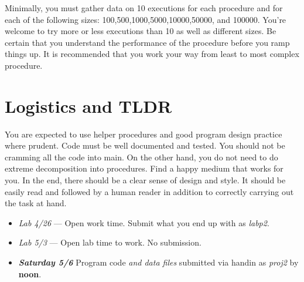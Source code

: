 \documentclass[]{tufte-handout}
\begin{document}
Minimally, you must gather data on 10 executions for each procedure and for each of the following sizes: 100,500,1000,5000,10000,50000, and 100000. You're welcome to try more or less executions than 10 as well as different sizes. Be certain that you understand the performance of the procedure before you ramp things up. It is recommended that you work your way from least to most complex procedure.

\section{Logistics and TLDR}

You are expected to use helper procedures and good program design practice where prudent. Code must be well documented and tested. You should not be cramming all the code into main. On the other hand, you do not need to do extreme decomposition into procedures.  Find a happy medium that works for you. In the end, there should be a clear sense of design and style. It should be easily read and followed by a human reader in addition to correctly carrying out the task at hand.



\begin{itemize}
\item \textit{Lab 4/26} --- Open work time. Submit what you end up with as \textit{labp2}.
\item \textit{Lab 5/3} --- Open lab time to work. No submission.
\item \textit{\textbf{Saturday 5/6}} Program code \textit{and data files} submitted via handin as \textit{proj2} by \textbf{noon}.
\end{itemize}
\end{document}
